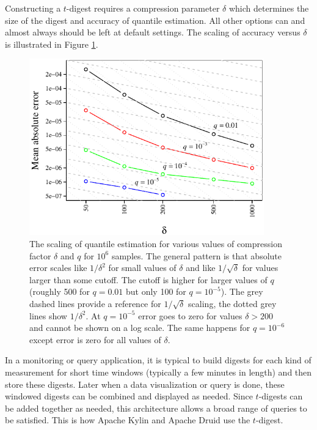 \documentclass[preprint,12pt, a4paper]{elsarticle}
\begin{document}
Constructing a $t$-digest requires a compression parameter $\delta$ which determines the size of the digest and accuracy of quantile estimation. All other options can and almost always should be left at default settings. The scaling of accuracy versus $\delta$ is illustrated in Figure \ref{fig:accuracy-scaling}.
\begin{figure}[htb] %
   \centering
   \includegraphics[width=4in]{figures/error-vs-compression.pdf} 
   \caption{The scaling of quantile estimation for various values of compression factor $\delta$ and $q$ for $10^6$ samples. 
   The general pattern is that absolute error scales like $1/\delta^2$ for small values of $\delta$ and like $1/\sqrt{\delta}$ for values larger than some cutoff. The cutoff is higher for larger values of $q$ (roughly 500 for $q=0.01$ but only 100 for $q=10^{-5}$). The grey dashed lines provide a reference for $1/\sqrt{\delta}$ scaling, the dotted grey lines show $1/\delta^2$.   At $q=10^{-5}$ error goes to zero for values $\delta > 200$ and cannot be shown on a log scale. The same happens for $q=10^{-6}$ except error is zero for all values of $\delta$. }
   \label{fig:accuracy-scaling}
\end{figure}

In a monitoring or query application, it is typical to build digests for each kind of measurement for short time windows (typically a few minutes in length) and then store these digests. Later when a data visualization or query is done, these windowed digests can be combined and displayed as needed.  Since $t$-digests can be added together as needed, this architecture allows a broad range of queries to be satisfied. This is how Apache Kylin\cite{kylin} and Apache Druid\cite{druid} use the $t$-digest. 
\end{document}
